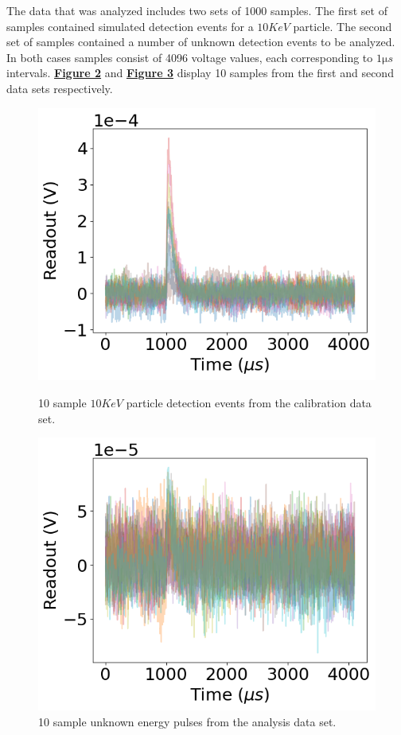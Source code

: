 \documentclass[
	letterpaper, %
	10pt, %
]{template}
\begin{document}
The data that was analyzed includes two sets of 1000 samples. The first set of samples contained simulated detection events for a $10\unit{KeV}$ particle. The second set of samples contained a number of unknown detection events to be analyzed. In both cases samples consist of 4096 voltage values, each corresponding to $1\unit{\micro s}$ intervals.
\textbf{\hyperref[fig::pulseCal]{Figure 2}} and \textbf{\hyperref[fig::pulseSig]{Figure 3}} display 10 samples from the first and second data sets respectively.
\begin{figure}[H]
	\begin{minipage}[t]{0.45\textwidth}
		\centering
		\includegraphics[width=\textwidth]{figures/pulses_cal.png}
		\caption{10 sample $10\unit{KeV}$ particle detection events from the calibration data set.~\label{fig::pulseCal}}
	\end{minipage}
	\hfill
	\begin{minipage}[t]{0.45\textwidth}
		\centering
		\includegraphics[width=\textwidth]{figures/pulses_signal.png}
		\caption{10 sample unknown energy pulses from the analysis data set.~\label{fig::pulseSig}}
	\end{minipage}
\end{figure}
\end{document}
